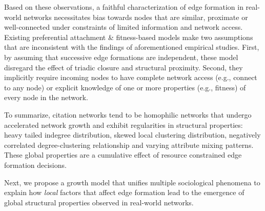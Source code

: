 Based on these observations, a faithful characterization of edge formation in real-world
networks necessitates bias towards nodes that are similar, proximate or
well-connected under constraints of limited information and network access.
Existing preferential attachment \& fitness-based models
\cite{dorogovtsev2000structure,kim2017effect,singh2017relay,barabasi1999emergence}
make two assumptions that are inconsistent with the findings of aforementioned
empirical studies.
First, by assuming that successive edge formations are independent, these model
disregard the effect of triadic closure and structural proximity. Second, they
implicitly require incoming nodes to have complete network access (e.g., connect
to any node) or explicit knowledge of one or more properties (e.g., fitness) of
every node in the network.

To summarize, citation networks tend to be homophilic networks that
undergo accelerated network growth and exhibit regularities in structural
properties: heavy tailed indegree distribution, skewed local clustering distribution,
negatively correlated degree-clustering relationship and varying attribute mixing patterns.
These global properties are a cumulative effect of resource constrained edge formation decisions.

Next, we propose a growth model that unifies multiple
sociological phenomena to explain how \textit{local} factors that affect
edge formation lead to the emergence of global structural properties
observed in real-world networks.

